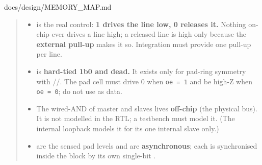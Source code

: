 \begin{relocated}{docs/design/MEMORY_MAP.md}
\begin{quote}
\begin{itemize}
\tightlist
\item
   is the real control: \textbf{1 drives the line low, 0
  releases it.} Nothing on-chip ever drives a line high; a released line
  is high only because the \textbf{external pull-up} makes it so.
  Integration must provide one pull-up per line.
\item
   is \textbf{hard-tied 1\textquotesingle b0 and dead.} It
  exists only for pad-ring symmetry with
  //. The pad cell must
  drive 0 when \texttt{oe\ =\allowbreak{}\ 1} and be high-Z when
  \texttt{oe\ =\allowbreak{}\ 0}; do not use  as data.
\item
  The wired-AND of master and slaves lives \textbf{off-chip} (the
  physical bus). It is not modelled in the RTL; a testbench must model
  it. (The internal loopback models it for its one internal slave only.)
\item
   are the sensed pad levels and are \textbf{asynchronous};
  each is synchronised inside the block by its own single-bit
  .
\end{itemize}
\end{quote}

{\small\setlength{\tabcolsep}{4pt}

}
\end{relocated}
